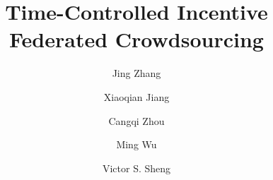 \documentclass[final,1p,times]{elsarticle}
\begin{document}
	
	\begin{frontmatter}
		
		\title{Time-Controlled Incentive Federated Crowdsourcing}
		
	
		\author[mymainaddress]{Jing Zhang
			}
		
		\author[mymainaddress]{Xiaoqian Jiang}
		
		
		\author[address2]{Cangqi Zhou}
		
		\author[address3]{Ming Wu}
		
		\author[address4]{Victor S. Sheng}
		
		
		\address[mymainaddress]{School of Cyber Science and Engineering, Southeast University, No. 2 SEU Road, Nanjing 211189, China}
		\address[address2]{School of Computer Science and Engineering, Nanjing University of Science and Technology, No. 200 Xiaolingwei Street, Nanjing 210094, China}
		\address[address3]{School of Artificial Intelligence and Automation, Hohai University, No. 8 Fochengxi  Road, Nanjing 211100, China}
		\address[address4]{Department of Computer Science, Texas Tech University, Lubbock, TX 79409, USA}
		

\end{frontmatter}
\end{document}
